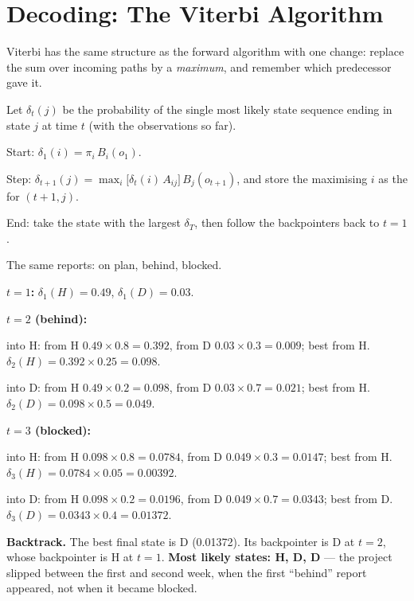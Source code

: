 \section{Decoding: The Viterbi Algorithm}

Viterbi has the same structure as the forward algorithm with one change: replace the
sum over incoming paths by a \emph{maximum}, and remember which predecessor gave it.

\begin{definitionbox}
Let $\delta_t(j)$ be the probability of the single most likely state sequence ending
in state $j$ at time $t$ (with the observations so far).
\begin{tight}
  \item Start: $\delta_1(i) = \pi_i\,B_i(o_1)$.
  \item Step: $\delta_{t+1}(j) = \max_i\big[\delta_t(i)\,A_{ij}\big]\,B_j(o_{t+1})$,
        and store the maximising $i$ as the  for $(t+1, j)$.
  \item End: take the state with the largest $\delta_T$, then follow the
        backpointers back to $t = 1$.
\end{tight}
\end{definitionbox}

\begin{worked}
The same reports: on plan, behind, blocked.

\smallskip
\textbf{$t = 1$:} $\delta_1(H) = 0.49$, $\delta_1(D) = 0.03$.

\textbf{$t = 2$ (behind):}
\begin{tight}
  \item into H: from H $0.49 \times 0.8 = 0.392$, from D $0.03 \times 0.3 = 0.009$;
        best from H. $\delta_2(H) = 0.392 \times 0.25 = 0.098$.
  \item into D: from H $0.49 \times 0.2 = 0.098$, from D $0.03 \times 0.7 = 0.021$;
        best from H. $\delta_2(D) = 0.098 \times 0.5 = 0.049$.
\end{tight}
\textbf{$t = 3$ (blocked):}
\begin{tight}
  \item into H: from H $0.098 \times 0.8 = 0.0784$, from D $0.049 \times 0.3 = 0.0147$;
        best from H. $\delta_3(H) = 0.0784 \times 0.05 = 0.00392$.
  \item into D: from H $0.098 \times 0.2 = 0.0196$, from D $0.049 \times 0.7 = 0.0343$;
        best from D. $\delta_3(D) = 0.0343 \times 0.4 = \mathbf{0.01372}$.
\end{tight}
\textbf{Backtrack.} The best final state is D (0.01372). Its backpointer is D at
$t = 2$, whose backpointer is H at $t = 1$. \textbf{Most likely states: H, D, D} ---
the project slipped between the first and second week, when the first ``behind''
report appeared, not when it became blocked.
\end{worked}

